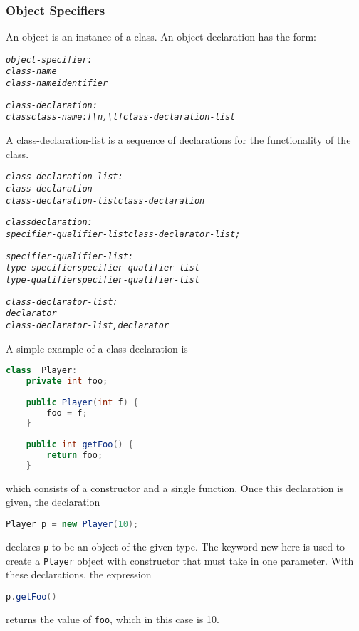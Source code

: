 \documentclass[12pt]{report}
\begin{document}
\subsubsection{Object Specifiers}
An object is an instance of a class. An object declaration has the form:
\begin{alltt}
         \textit{object-specifier:}
              \textit{class-name}
              \textit{class-name identifier}
              
         \textit{class-declaration:}
              \textit{class class-name: [\textbackslash{n}, \textbackslash{t}] class-declaration-list}
\end{alltt}
A class-declaration-list is a sequence of declarations for the functionality of the class.
\begin{alltt}
         \textit{class-declaration-list:}
              \textit{class-declaration}
              \textit{class-declaration-list class-declaration}
              
         \textit{class declaration:}
              \textit{specifier-qualifier-list class-declarator-list;}
              \textit{}
              
         \textit{specifier-qualifier-list:}
              \textit{type-specifier specifier-qualifier-list}
              \textit{type-qualifier specifier-qualifier-list}
              
         \textit{class-declarator-list:}
              \textit{declarator}
              \textit{class-declarator-list, declarator}
\end{alltt}
A simple example of a class declaration is
\begin{lstlisting}[language=Java,label=some-code,caption=Class declaration]
class  Player: 
	private int foo;
	
	public Player(int f) {
		foo = f;
	}
	
	public int getFoo() {
		return foo;
	}
\end{lstlisting}
\begin{doublespace}which consists of a constructor and a single function. Once this declaration is given, the declaration
\end{doublespace}
\begin{lstlisting}[language=Java,label=some-code,caption=Object declaration]
Player p = new Player(10);
\end{lstlisting}
\begin{doublespace}
declares \texttt{p} to be an object of the given type. The keyword new here is used to create a \texttt{Player} object with constructor that must take in one parameter. With these declarations, the expression
\end{doublespace}
\begin{lstlisting}[language=Java,label=some-code,caption=Returns foo]
p.getFoo()
\end{lstlisting}
returns the value of \texttt{foo}, which in this case is 10. 
\end{document}
